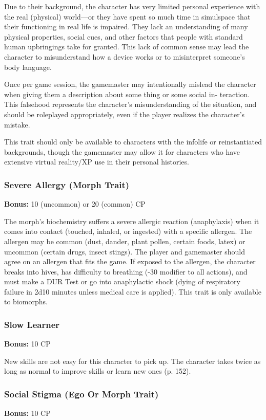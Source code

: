 Due to their background, the character has very limited personal experience
with the real (physical) world—or they have spent so much time in simulspace
that their functioning in real life is impaired.  They lack an understanding of
many physical properties, social cues, and other factors that people with
standard human upbringings take for granted. This lack of common sense may lead
the character to misunderstand how a device works or to misinterpret someone’s
body language.

Once per game session, the gamemaster may intentionally mislead the character
when giving them a description about some thing or some social in-
teraction. This falsehood represents the character’s misunderstanding of the
situation, and should be roleplayed appropriately, even if the player realizes
the character’s mistake.

This trait should only be available to characters with the infolife or
reinstantiated backgrounds, though the gamemaster may allow it for characters
who have extensive virtual reality/XP use in their personal histories.

\subsubsection{Severe Allergy (Morph Trait)}
\textbf{Bonus:} 10 (uncommon) or 20 (common) CP

The morph’s biochemistry suffers a severe allergic reaction (anaphylaxis) when
it comes into contact (touched, inhaled, or ingested) with a specific allergen.
The allergen may be common (dust, dander, plant pollen, certain foods, latex)
or uncommon (certain drugs, insect stings). The player and gamemaster should
agree on an allergen that fits the game. If exposed to the allergen, the
character breaks into hives, has difficulty to breathing (-30 modifier to all
actions), and must make a DUR Test or go into anaphylactic shock (dying of
respiratory failure in 2d10 minutes unless medical care is applied).  This
trait is only available to biomorphs.

\subsubsection{Slow Learner}
\textbf{Bonus:} 10 CP

New skills are not easy for this character to pick up. The character takes
twice as long as normal to improve skills or learn new ones (p. 152).

\subsubsection{Social Stigma (Ego Or Morph Trait)}
\textbf{Bonus:} 10 CP

